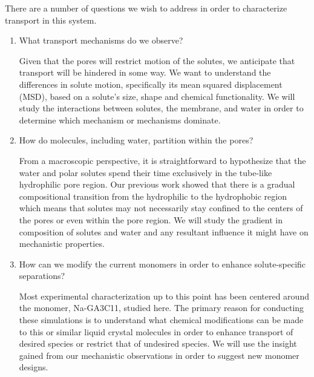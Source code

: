 \documentclass{article}
\begin{document}
  \noindent There are a number of questions we wish to address in order to characterize
  transport in this system.
  \begin{enumerate}
  
   	\item What transport mechanisms do we observe? \label{question:mechanisms}
  	
  	Given that the pores will restrict motion of the solutes, we anticipate that 
  	transport will be hindered in some way. We want to understand the differences in
  	solute motion, specifically its mean squared displacement (MSD), based on a solute's
  	size, shape and chemical functionality. We will study the interactions
  	between solutes, the membrane, and water in order to determine which mechanism
  	or mechanisms dominate.
  
  	\item How do molecules, including water, partition within the pores? \label{question:partition}
  	
  	From a macroscopic perspective, it is straightforward to hypothesize that the water and
  	polar solutes spend their time exclusively in the tube-like hydrophilic pore region.
  	Our previous work showed that there is a gradual compositional transition from the 
  	hydrophilic to the hydrophobic region which means that solutes may not 
  	necessarily stay confined to the centers of the pores or even within the
  	pore region. We will study the gradient in composition of solutes and water
  	and any resultant influence it might have on mechanistic properties.
  	
%  	
  	
  	\item How can we modify the current monomers in order to enhance
  	solute-specific separations? \label{question:math}
  	
  	Most experimental characterization up to this point has been centered 
  	around the monomer, Na-GA3C11, studied here. The primary reason for conducting
  	these simulations is to understand what chemical modifications can be made 
  	to this or similar liquid crystal molecules in order to enhance transport 
  	of desired species or restrict that of undesired species. We will use the 
  	insight gained from our mechanistic observations in order to suggest new 
  	monomer designs.
  	
  \end{enumerate} 
  
\end{document}
